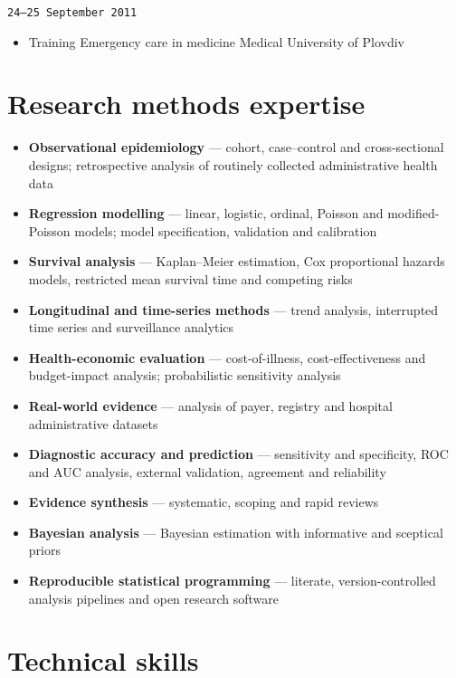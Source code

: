 \documentclass[
  10.5pt,
  a4paper,
  DIV=11,
  numbers=noendperiod]{scrartcl}
\providecommand{\tightlist}{%
  \setlength{\itemsep}{0pt}\setlength{\parskip}{0pt}}
\let\oldtexttt\texttt
\renewcommand{\texttt}[1]{{\color{cvbronze}\small\oldtexttt{#1}}}
\begin{document}
\texttt{24–25\ September\ 2011}

\begin{itemize}
\tightlist
\item
  Training \textbar{} Emergency care in medicine \textbar{} Medical
  University of Plovdiv
\end{itemize}

\section{Research methods expertise}\label{research-methods-expertise}

\begin{itemize}
\tightlist
\item
  \textbf{Observational epidemiology} --- cohort, case--control and
  cross-sectional designs; retrospective analysis of routinely collected
  administrative health data
\item
  \textbf{Regression modelling} --- linear, logistic, ordinal, Poisson
  and modified-Poisson models; model specification, validation and
  calibration
\item
  \textbf{Survival analysis} --- Kaplan--Meier estimation, Cox
  proportional hazards models, restricted mean survival time and
  competing risks
\item
  \textbf{Longitudinal and time-series methods} --- trend analysis,
  interrupted time series and surveillance analytics
\item
  \textbf{Health-economic evaluation} --- cost-of-illness,
  cost-effectiveness and budget-impact analysis; probabilistic
  sensitivity analysis
\item
  \textbf{Real-world evidence} --- analysis of payer, registry and
  hospital administrative datasets
\item
  \textbf{Diagnostic accuracy and prediction} --- sensitivity and
  specificity, ROC and AUC analysis, external validation, agreement and
  reliability
\item
  \textbf{Evidence synthesis} --- systematic, scoping and rapid reviews
\item
  \textbf{Bayesian analysis} --- Bayesian estimation with informative
  and sceptical priors
\item
  \textbf{Reproducible statistical programming} --- literate,
  version-controlled analysis pipelines and open research software
\end{itemize}

\section{Technical skills}\label{technical-skills}
\end{document}
